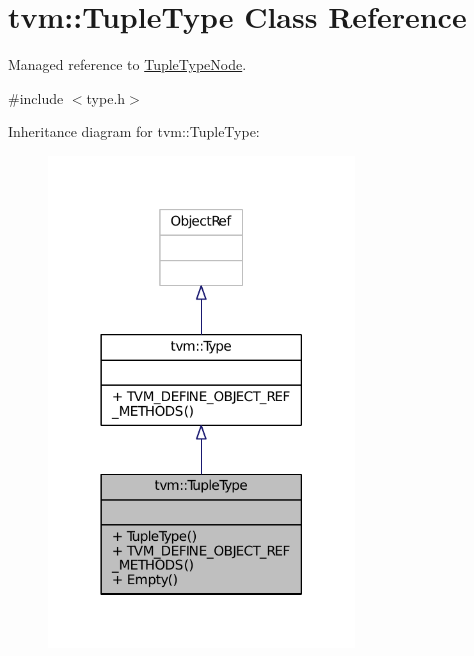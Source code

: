 \hypertarget{classtvm_1_1TupleType}{}\section{tvm\+:\+:Tuple\+Type Class Reference}
\label{classtvm_1_1TupleType}


Managed reference to \hyperlink{classtvm_1_1TupleTypeNode}{Tuple\+Type\+Node}.  




{\ttfamily \#include $<$type.\+h$>$}



Inheritance diagram for tvm\+:\+:Tuple\+Type\+:
\nopagebreak
\begin{figure}[H]
\begin{center}
\leavevmode
\includegraphics[width=230pt]{classtvm_1_1TupleType__inherit__graph}
\end{center}
\end{figure}


